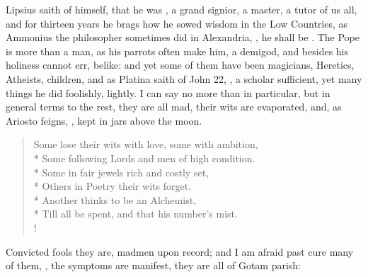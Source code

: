 
Lipsius saith of himself, that he was , a grand signior, a master, a tutor of us all,
and for thirteen years he brags how he sowed wisdom in the Low Countries, as
Ammonius the philosopher sometimes did in Alexandria,
, he shall be . The Pope is more than
a man, as his parrots often make him, a demigod, and
besides his holiness cannot err,  belike: and yet some of them
have been magicians, Heretics, Atheists, children, and as Platina saith of John
22, , a scholar sufficient, yet many things
he did foolishly, lightly. I can say no more than in particular, but in general
terms to the rest, they are all mad, their wits are evaporated, and, as Ariosto
feigns, , kept in jars above the moon.

\begin{verse}%
Some lose their wits with love, some with ambition,\\*
Some following Lords and men of high condition.\\*
Some in fair jewels rich and costly set,\\*
Others in Poetry their wits forget.\\*
Another thinks to be an Alchemist,\\*
Till all be spent, and that his number's mist.\\!
\end{verse}%

Convicted fools they are, madmen upon record; and I am afraid past cure many of
them, , the symptoms are manifest, they
are all of Gotam parish:

